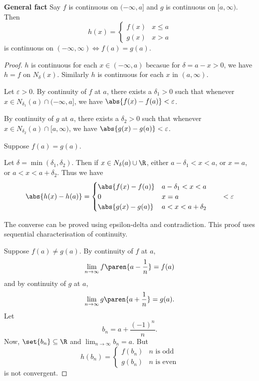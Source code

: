\textbf{General fact}
Say $f$ is continuous on $(-\infty, a]$ and $g$ is continuous on $[a, \infty)$. Then \[
    h(x) = \begin{cases}
        f(x) & x \leq a \\
        g(x) & x > a
    \end{cases}
\] is continuous on $(-\infty, \infty) \iff f(a) = g(a)$.
\begin{proof}
    $h$ is continuous for each $x \in (-\infty, a)$ becasue for $\delta = a - x > 0$, we have $h = f$ on $N_{\delta}(x)$. Similarly $h$ is continuous for each $x$ in $(a, \infty)$.

    Let $\varepsilon > 0$. By continuity of $f$ at $a$, there exists a $\delta_{1} > 0$ such that whenever $x \in N_{\delta_{1}}(a) \cap (-\infty, a]$, we have $\abs{ f(x) - f(a) } < \varepsilon$.
    
    By continuity of $g$ at $a$, there exists a $\delta_{2} > 0$ such that whenever $x \in N_{\delta_{2}}(a) \cap [a, \infty)$, we have $\abs{ g(x) - g(a) } < \varepsilon$.

    Suppose $f(a) = g(a)$.

    Let $\delta = \min(\delta_{1}, \delta_{2})$. Then if $x \in N_{\delta}(a) \cup \R$, either $a - \delta_{1} < x < a$, or $x = a$, or $a < x < a + \delta_{2}$. Thus we have \[
        \abs{ h(x) - h(a) } = \begin{cases}
            \abs{ f(x) - f(a) } & a - \delta_{1} < x < a \\
            0 & x = a \\
            \abs{ g(x) - g(a) } & a < x < a + \delta_{2}
        \end{cases} \qquad < \varepsilon
    \]

    The converse can be proved using epsilon-delta and contradiction. This proof uses sequential characterisation of continuity.

    Suppose $f(a) \neq g(a)$. By continuity of $f$ at $a$, \[
        \lim_{n \to \infty} f\paren{a - \frac{1}{n}} = f(a)
    \] and by continuity of $g$ at $a$, \[
        \lim_{n \to \infty} g\paren{a + \frac{1}{n}} = g(a).
    \] Let \[
        b_{n} = a + \frac{(-1)^{n}}{n}.
    \] Now, $\set{b_{n}} \subseteq \R$ and $\lim_{n \to \infty} b_{n} = a$. But \[
        h(b_{n}) = \begin{cases}
            f(b_{n}) & n \text{ is odd} \\
            g(b_{n}) & n \text{ is even}
        \end{cases}
    \] is not convergent.
\end{proof}

